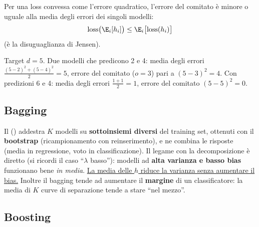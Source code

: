 \begin{teorema}
Per una loss convessa come l'errore quadratico, l'errore del comitato è minore o uguale alla media degli errori
dei singoli modelli:
\[
\mathrm{loss}\big(\E_i[h_i]\big) \le \E_i\big[\mathrm{loss}(h_i)\big]
\]
(è la disuguaglianza di Jensen).
\end{teorema}

\begin{esempio}
Target $d=5$. Due modelli che predicono 2 e 4: media degli errori $\frac{(5-2)^2+(5-4)^2}{2} = 5$, errore del
comitato ($o=3$) pari a $(5-3)^2 = 4$. Con predizioni 6 e 4: media degli errori $\frac{1+1}{2}=1$, errore del
comitato $(5-5)^2 = 0$.
\end{esempio}

\subsection{Bagging}

Il  () addestra $K$ modelli su \textbf{sottoinsiemi diversi} del
training set, ottenuti con il \textbf{bootstrap} (ricampionamento con reinserimento), e ne combina le risposte
(media in regressione, voto in classificazione). Il legame con la decomposizione è diretto (si ricordi il caso
``$\lambda$ basso''): modelli ad \textbf{alta varianza e basso bias} funzionano bene \emph{in media}.
\uline{La media delle $h$ riduce la varianza senza aumentare il bias.} Inoltre il bagging tende ad aumentare il
\textbf{margine} di un classificatore: la media di $K$ curve di separazione tende a stare ``nel mezzo''.

\subsection{Boosting}

